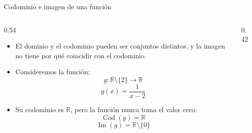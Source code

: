 \documentclass[main.tex]{subfiles}
\begin{document}
\begin{frame}{Codominio e imagen de una función}
  \begin{columns}[c,onlytextwidth]
    \begin{column}{0.54\textwidth}
      \begin{itemize}
        \item El dominio y el codominio pueden ser conjuntos distintos,
              y la imagen no tiene por qué coincidir con el codominio.

        \item Consideremos la función:
              \[
                g:\mathbb{R}\setminus\{2\}\longrightarrow\mathbb{R}
              \]
              \[
                g(x)=\frac{1}{x-2}
              \]

        \item Su codominio es $\mathbb{R}$, pero la función nunca toma
              el valor cero:
              \[
                \operatorname{Cod}(g)=\mathbb{R}
              \]
              \[
                \operatorname{Im}(g)=\mathbb{R}\setminus\{0\}
              \]
      \end{itemize}
    \end{column}
    \begin{column}{0.42\textwidth}
      \centering
    \end{column}
  \end{columns}
\end{frame}

\end{document}
